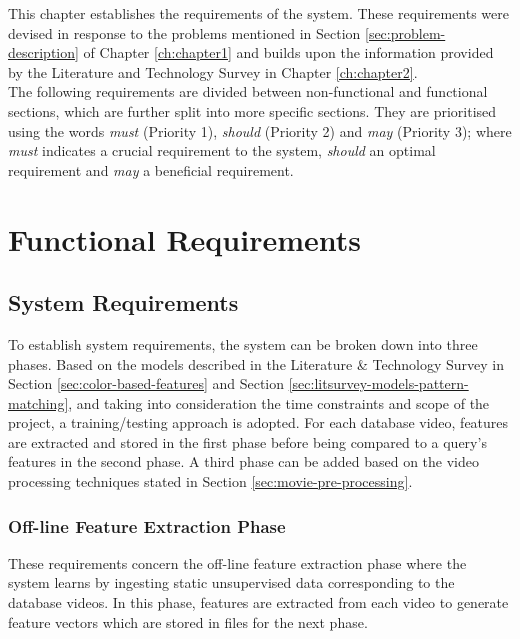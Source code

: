 This chapter establishes the requirements of the system. These requirements were devised in response to the problems mentioned in Section \ref{sec:problem-description} of Chapter \ref{ch:chapter1} and builds upon the information provided by the Literature and Technology Survey in Chapter \ref{ch:chapter2}.\\

The following requirements are divided between non-functional and functional sections, which are further split into more specific sections. They are prioritised using the words \textit{must} (Priority 1), \textit{should} (Priority 2) and \textit{may} (Priority 3); where \textit{must} indicates a crucial requirement to the system, \textit{should} an optimal requirement and \textit{may} a beneficial requirement.\\

\section{Functional Requirements}

\subsection{System Requirements}

To establish system requirements, the system can be broken down into three phases. Based on the models described in the Literature \& Technology Survey in Section \ref{sec:color-based-features} and Section \ref{sec:litsurvey-models-pattern-matching}, and taking into consideration the time constraints and scope of the project, a training/testing approach is adopted. For each database video, features are extracted and stored in the first phase before being compared to a query's features in the second phase. A third phase can be added based on the video processing techniques stated in Section \ref{sec:movie-pre-processing}.

\subsubsection{Off-line Feature Extraction Phase}

These requirements concern the off-line feature extraction phase where the system learns by ingesting static unsupervised data corresponding to the database videos. In this phase, features are extracted from each video to generate feature vectors which are stored in files for the next phase.


